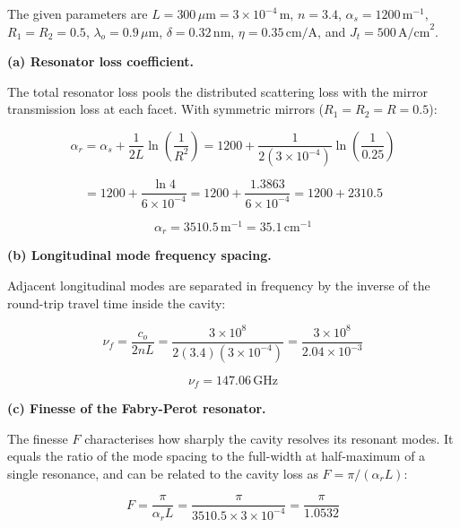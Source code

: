 The given parameters are $L = 300\,\mu\text{m} = 3\times10^{-4}\,\text{m}$, $n = 3.4$, $\alpha_s = 1200\,\text{m}^{-1}$, $R_1 = R_2 = 0.5$, $\lambda_o = 0.9\,\mu\text{m}$, $\delta = 0.32\,\text{nm}$, $\eta = 0.35\,\text{cm/A}$, and $J_t = 500\,\text{A/cm}^2$.

\textbf{(a) Resonator loss coefficient.}

The total resonator loss pools the distributed scattering loss with the mirror transmission loss at each facet. With symmetric mirrors ($R_1 = R_2 = R = 0.5$):

\begin{equation*}
  \alpha_r = \alpha_s + \frac{1}{2L}\ln\!\left(\frac{1}{R^2}\right) = 1200 + \frac{1}{2(3\times10^{-4})}\ln\!\left(\frac{1}{0.25}\right)
\end{equation*}

\begin{equation*}
  = 1200 + \frac{\ln 4}{6\times10^{-4}} = 1200 + \frac{1.3863}{6\times10^{-4}} = 1200 + 2310.5
\end{equation*}

\begin{equation*}
  \boxed{\alpha_r = 3510.5\,\text{m}^{-1} = 35.1\,\text{cm}^{-1}}
\end{equation*}

\textbf{(b) Longitudinal mode frequency spacing.}

Adjacent longitudinal modes are separated in frequency by the inverse of the round-trip travel time inside the cavity:

\begin{equation*}
  \nu_f = \frac{c_o}{2nL} = \frac{3\times10^8}{2(3.4)(3\times10^{-4})} = \frac{3\times10^8}{2.04\times10^{-3}}
\end{equation*}

\begin{equation*}
  \boxed{\nu_f = 147.06\,\text{GHz}}
\end{equation*}

\textbf{(c) Finesse of the Fabry-Perot resonator.}

The finesse $F$ characterises how sharply the cavity resolves its resonant modes. It equals the ratio of the mode spacing to the full-width at half-maximum of a single resonance, and can be related to the cavity loss as $F = \pi / (\alpha_r L)$:

\begin{equation*}
  F = \frac{\pi}{\alpha_r L} = \frac{\pi}{3510.5 \times 3\times10^{-4}} = \frac{\pi}{1.0532}
\end{equation*}

